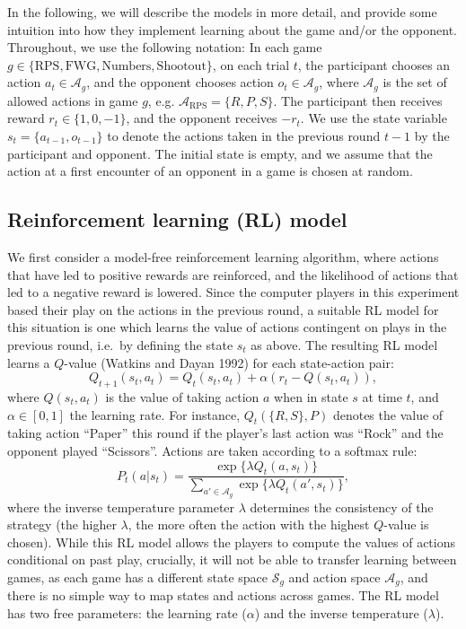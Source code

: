 \documentclass[smallextended]{svjour3}       %
\begin{document}
In the following, we will describe the models in more detail, and
provide some intuition into how they implement learning about the game
and/or the opponent. Throughout, we use the following notation: In each
game
\(g \in \{\text{RPS},\text{FWG}, \text{Numbers}, \text{Shootout} \}\),
on each trial \(t\), the participant chooses an action
\(a_t \in \mathcal{A}_g\), and the opponent chooses action
\(o_t \in \mathcal{A}_g\), where \(\mathcal{A}_g\) is the set of allowed
actions in game \(g\), e.g. \(\mathcal{A}_\text{RPS} = \{R,P,S\}\). The
participant then receives reward \(r_t \in \{1,0,-1\}\), and the
opponent receives \(-r_t\). We use the state variable
\(s_t = \{a_{t-1},o_{t-1}\}\) to denote the actions taken in the
previous round \(t-1\) by the participant and opponent. The initial
state is empty, and we assume that the action at a first encounter of an
opponent in a game is chosen at random.

\hypertarget{reinforcement-learning-rl-model}{%
\subsection{Reinforcement learning (RL)
model}\label{reinforcement-learning-rl-model}}

We first consider a model-free reinforcement learning algorithm, where
actions that have led to positive rewards are reinforced, and the
likelihood of actions that led to a negative reward is lowered. Since
the computer players in this experiment based their play on the actions
in the previous round, a suitable RL model for this situation is one
which learns the value of actions contingent on plays in the previous
round, i.e.~by defining the state \(s_{t}\) as above. The resulting RL
model learns a \(Q\)-value (Watkins and Dayan 1992) for each
state-action pair:
\[Q_{t+1}(s_{t},a_{t}) = Q_{t}(s_{t},a_{t}) + \alpha \left( r_{t}  - Q(s_{t},a_{t}) \right) ,\]
where \(Q(s_{t},a_{t})\) is the value of taking action \(a\) when in
state \(s\) at time \(t\), and \(\alpha \in [0,1]\) the learning rate.
For instance, \(Q_t(\{R,S\},P)\) denotes the value of taking action
``Paper'' this round if the player's last action was ``Rock'' and the
opponent played ``Scissors''. Actions are taken according to a softmax
rule:
\[P_{t}(a|s_t) = \frac{\exp \{ \lambda Q_{t}(a,s_t) \}}{\sum_{a' \in \mathcal{A}_g} \exp \{\lambda  Q_{t}(a',s_t) \}}, \]
where the inverse temperature parameter \(\lambda\) determines the
consistency of the strategy (the higher \(\lambda\), the more often the
action with the highest \(Q\)-value is chosen). While this RL model
allows the players to compute the values of actions conditional on past
play, crucially, it will not be able to transfer learning between games,
as each game has a different state space \(\mathcal{S}_g\) and action
space \(\mathcal{A}_g\), and there is no simple way to map states and
actions across games. The RL model has two free parameters: the learning
rate (\(\alpha\)) and the inverse temperature (\(\lambda\)).
\end{document}
